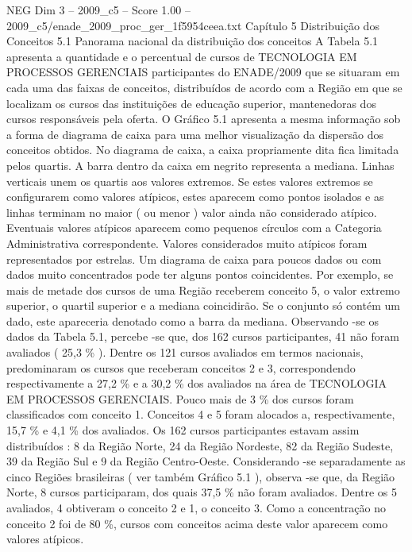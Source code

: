 \begin{textsample}{NEG Dim 3 – 2009\_c5 – Score 1.00 – 2009\_c5/enade\_2009\_proc\_ger\_1f5954ceea.txt}  \label{ex:f3_neg_114}
Capítulo 5 Distribuição dos Conceitos 5.1 Panorama nacional da distribuição dos conceitos A Tabela 5.1 apresenta a quantidade e o percentual de cursos de TECNOLOGIA EM PROCESSOS GERENCIAIS participantes do ENADE/2009 que se situaram em cada uma das faixas de conceitos, distribuídos de acordo com a Região em que se localizam os cursos das instituições de educação superior, mantenedoras dos cursos responsáveis pela oferta.
O Gráfico 5.1 apresenta a mesma informação sob a forma de diagrama de caixa para uma melhor visualização da dispersão dos conceitos obtidos.
No diagrama de caixa, a caixa propriamente dita fica limitada pelos quartis.
A barra dentro da caixa em negrito representa a mediana.
Linhas verticais unem os quartis aos valores extremos.
Se estes valores extremos se configurarem como valores atípicos, estes aparecem como pontos isolados e as linhas terminam no maior ( ou menor ) valor ainda não considerado atípico.
Eventuais valores atípicos aparecem como pequenos círculos com a Categoria Administrativa correspondente.
Valores considerados muito atípicos foram representados por estrelas.
Um diagrama de caixa para poucos dados ou com dados muito concentrados pode ter alguns pontos coincidentes.
Por exemplo, se mais de metade dos cursos de uma Região receberem conceito 5, o valor extremo superior, o quartil superior e a mediana coincidirão.
Se o conjunto só contém um dado, este apareceria denotado como a barra da mediana.
Observando -se os dados da Tabela 5.1, percebe -se que, dos 162 cursos participantes, 41 não foram avaliados ( 25,3 \% ).
Dentre os 121 cursos avaliados em termos nacionais, predominaram os cursos que receberam conceitos 2 e 3, correspondendo respectivamente a 27,2 \% e a 30,2 \% dos avaliados na área de TECNOLOGIA EM PROCESSOS GERENCIAIS.
Pouco mais de 3 \% dos cursos foram classificados com conceito 1.
Conceitos 4 e 5 foram alocados a, respectivamente, 15,7 \% e 4,1 \% dos avaliados.
Os 162 cursos participantes estavam assim distribuídos : 8 da Região Norte, 24 da Região Nordeste, 82 da Região Sudeste, 39 da Região Sul e 9 da Região Centro-Oeste.
Considerando -se separadamente as cinco Regiões brasileiras ( ver também Gráfico 5.1 ), observa -se que, da Região Norte, 8 cursos participaram, dos quais 37,5 \% não foram avaliados.
Dentre os 5 avaliados, 4 obtiveram o conceito 2 e 1, o conceito 3.
Como a concentração no conceito 2 foi de 80 \%, cursos com conceitos acima deste valor aparecem como valores atípicos.

\end{textsample}
